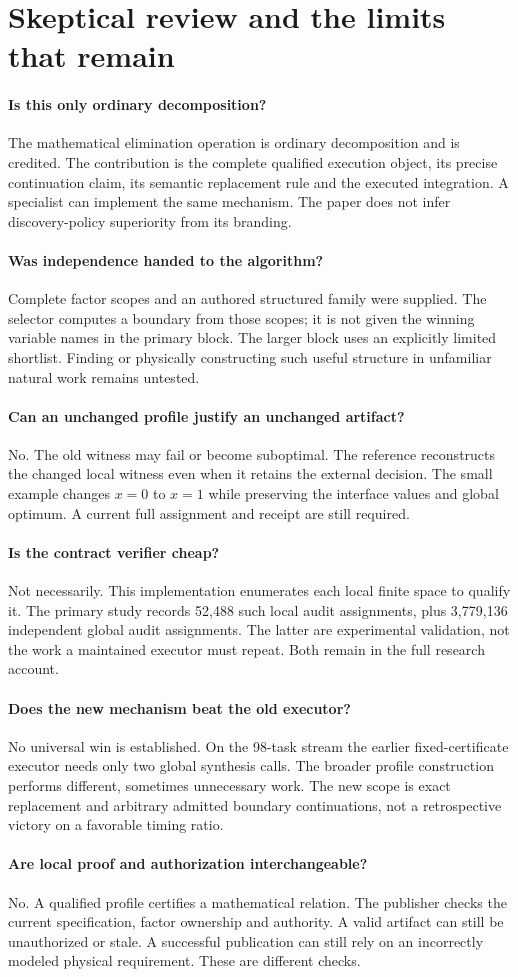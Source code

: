 \documentclass[11pt,letterpaper]{article}
\theoremstyle{definition}\newtheorem{definition}[theorem]{Definition}
\theoremstyle{remark}\newtheorem{remark}[theorem]{Remark}
\newcommand{\phead}[1]{\Needspace{4\baselineskip}\paragraph{#1}}
\begin{document}
\FloatBarrier
\section{Skeptical review and the limits that remain}
\label{app:review}
\phead{Is this only ordinary decomposition?}
The mathematical elimination operation is ordinary decomposition and is credited. The contribution is the complete qualified execution object, its precise continuation claim, its semantic replacement rule and the executed integration. A specialist can implement the same mechanism. The paper does not infer discovery-policy superiority from its branding.

\phead{Was independence handed to the algorithm?}
Complete factor scopes and an authored structured family were supplied. The selector computes a boundary from those scopes; it is not given the winning variable names in the primary block. The larger block uses an explicitly limited shortlist. Finding or physically constructing such useful structure in unfamiliar natural work remains untested.

\phead{Can an unchanged profile justify an unchanged artifact?}
No. The old witness may fail or become suboptimal. The reference reconstructs the changed local witness even when it retains the external decision. The small example changes $x=0$ to $x=1$ while preserving the interface values and global optimum. A current full assignment and receipt are still required.

\phead{Is the contract verifier cheap?}
Not necessarily. This implementation enumerates each local finite space to qualify it. The primary study records 52,488 such local audit assignments, plus 3,779,136 independent global audit assignments. The latter are experimental validation, not the work a maintained executor must repeat. Both remain in the full research account.

\phead{Does the new mechanism beat the old executor?}
No universal win is established. On the 98-task stream the earlier fixed-certificate executor needs only two global synthesis calls. The broader profile construction performs different, sometimes unnecessary work. The new scope is exact replacement and arbitrary admitted boundary continuations, not a retrospective victory on a favorable timing ratio.

\phead{Are local proof and authorization interchangeable?}
No. A qualified profile certifies a mathematical relation. The publisher checks the current specification, factor ownership and authority. A valid artifact can still be unauthorized or stale. A successful publication can still rely on an incorrectly modeled physical requirement. These are different checks.
\end{document}
